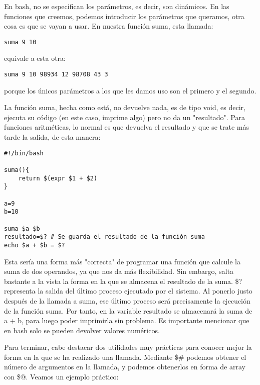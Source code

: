 En bash, no se especifican los parámetros, es decir, son dinámicos. En las funciones que creemos, podemos introducir los parámetros que queramos, otra cosa es que se vayan a usar. En nuestra función suma, esta llamada:

\begin{tcolorbox-code}
\begin{lstlisting}
suma 9 10
\end{lstlisting}
\end{tcolorbox-code}

equivale a esta otra:

\begin{tcolorbox-code}
\begin{lstlisting}
suma 9 10 98934 12 98708 43 3
\end{lstlisting}
\end{tcolorbox-code}

porque los únicos parámetros a los que les damos uso son el primero y el segundo.

La función suma, hecha como está, no devuelve nada, es de tipo void, es decir, ejecuta su código (en este caso, imprime algo) pero no da un "resultado". Para funciones aritméticas, lo normal es que devuelva el resultado y que se trate más tarde la salida, de esta manera:

\begin{tcolorbox-code}
\begin{lstlisting}
#!/bin/bash

suma(){
	return $(expr $1 + $2)
}

a=9
b=10

suma $a $b
resultado=$? # Se guarda el resultado de la función suma
echo $a + $b = $?
\end{lstlisting}
\end{tcolorbox-code}

Esta sería una forma más "correcta" de programar una función que calcule la suma de dos operandos, ya que nos da más flexibilidad. Sin embargo, salta bastante a la vista la forma en la que se almacena el resultado de la suma. \$? representa la salida del último proceso ejecutado por el sistema. Al ponerlo justo después de la llamada a suma, ese último proceso será precisamente la ejecución de la función suma. Por tanto, en la variable resultado se almacenará la suma de a + b, para luego poder imprimirla sin problema. Es importante mencionar que en bash solo se pueden devolver valores numéricos.

Para terminar, cabe destacar dos utilidades muy prácticas para conocer mejor la forma en la que se ha realizado una llamada. Mediante \$\# podemos obtener el número de argumentos en la llamada, y podemos obtenerlos en forma de array con \$@. Veamos un ejemplo práctico:

